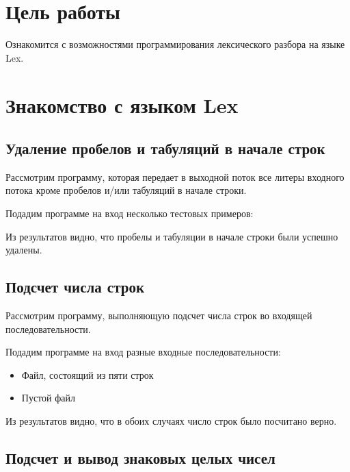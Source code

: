 





\tableofcontents
\newpage

\section{Цель работы}

Ознакомится с возможностями программирования лексического разбора на языке Lex.

\section{Знакомство с языком Lex}

\subsection{Удаление пробелов и табуляций в начале строк}

Рассмотрим программу, которая передает в выходной поток все литеры входного потока кроме пробелов и/или табуляций в начале строки.


Подадим программе на вход несколько тестовых примеров:


Из результатов видно, что пробелы и табуляции в начале строки были успешно удалены.

\subsection{Подсчет числа строк}

Рассмотрим программу, выполняющую подсчет числа строк во входящей последовательности.


Подадим программе на вход разные входные последовательности:
\begin{itemize}
	\item Файл, состоящий из пяти строк
	\item Пустой файл
\end{itemize}


Из результатов видно, что в обоих случаях число строк было посчитано верно.

\subsection{Подсчет и вывод знаковых целых чисел}

